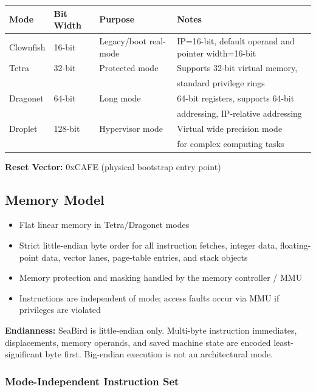 \documentclass[11pt]{article}
\begin{document}
\begin{table}[h]
\centering
\begin{tabular}{@{}lllL{7.2cm}@{}}
\toprule
\textbf{Mode} & \textbf{Bit Width} & \textbf{Purpose} & \textbf{Notes} \\ \midrule
Clownfish & 16-bit & Legacy/boot real-mode & IP=16-bit, default operand and pointer width=16-bit \\
Tetra & 32-bit & Protected mode & Supports 32-bit virtual memory, \\
 &  &  & standard privilege rings \\
Dragonet & 64-bit & Long mode & 64-bit registers, supports 64-bit \\
 &  &  & addressing, IP-relative addressing \\
Droplet & 128-bit & Hypervisor mode & Virtual wide precision mode \\ & & & for complex computing tasks\\ \bottomrule
\end{tabular}
\end{table}

\textbf{Reset Vector:} 0xCAFE (physical bootstrap entry point)

\subsection{Memory Model}

\begin{itemize}
    \item Flat linear memory in Tetra/Dragonet modes
    \item Strict little-endian byte order for all instruction fetches, integer data, floating-point data, vector lanes, page-table entries, and stack objects
    \item Memory protection and masking handled by the memory controller / MMU
    \item Instructions are independent of mode; access faults occur via MMU if privileges are violated
\end{itemize}

\textbf{Endianness:} SeaBird is little-endian only. Multi-byte instruction immediates, displacements, memory operands, and saved machine state are encoded least-significant byte first. Big-endian execution is not an architectural mode.

\subsubsection{Mode-Independent Instruction Set}
\end{document}
